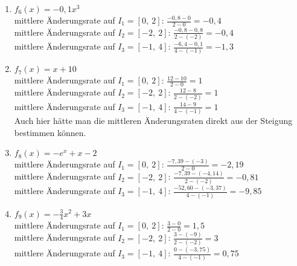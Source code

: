 \begin{Answer}[ref=aenderungsrateA2]
\begin{enumerate}[label=\alph*)]
		\item \(f_6(x)=-0,1x^3\)\\
		mittlere Änderungsrate auf \(I_1=[0,\ 2]\): \(\frac{-0,8-0}{2-0}=-0,4\)\\
		mittlere Änderungsrate auf \(I_2=[-2,\ 2]\): \(\frac{-0,8-0,8}{2-(-2)}=-0,4\)\\
		mittlere Änderungsrate auf \(I_3=[-1,\ 4]\): \(\frac{-6,4-0,1}{4-(-1)}=-1,3\)\\
		\item \(f_7(x)=x+10\)\\
		mittlere Änderungsrate auf \(I_1=[0,\ 2]\): \(\frac{12-10}{2-0}=1\)\\
		mittlere Änderungsrate auf \(I_2=[-2,\ 2]\): \(\frac{12-8}{2-(-2)}=1\)\\
		mittlere Änderungsrate auf \(I_3=[-1,\ 4]\): \(\frac{14-9}{4-(-1)}=1\)\\
		Auch hier hätte man die mittleren Änderungsraten direkt aus der Steigung bestimmen können.
		\item \(f_8(x)=-e^x+x-2\)\\
		mittlere Änderungsrate auf \(I_1=[0,\ 2]\): \(\frac{-7,39-(-3)}{2-0}=-2,19\)\\
		mittlere Änderungsrate auf \(I_2=[-2,\ 2]\): \(\frac{-7,39-(-4,14)}{2-(-2)}=-0,81\)\\
		mittlere Änderungsrate auf \(I_3=[-1,\ 4]\): \(\frac{-52,60-(-3,37)}{4-(-1)}=-9,85\)\\
		\item \(f_9(x)=-\frac{3}{4}x^2+3x\)\\
		mittlere Änderungsrate auf \(I_1=[0,\ 2]\): \(\frac{3-0}{2-0}=1,5\)\\
		mittlere Änderungsrate auf \(I_2=[-2,\ 2]\): \(\frac{3-(-9)}{2-(-2)}=3\)\\
		mittlere Änderungsrate auf \(I_3=[-1,\ 4]\): \(\frac{0-(-3,75)}{4-(-1)}=0,75\)\\
	\end{enumerate}
\end{Answer}